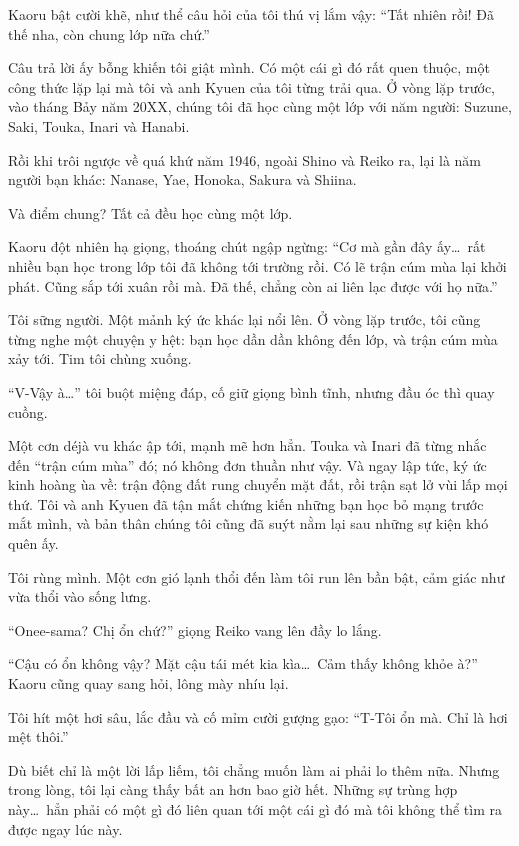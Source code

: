 \documentclass[../main.tex]{subfiles}
\begin{document}
Kaoru bật cười khẽ, như thể câu hỏi của tôi thú vị lắm vậy: ``Tất nhiên rồi! Đã thế nha, còn chung lớp nữa chứ.''

Câu trả lời ấy bỗng khiến tôi giật mình. Có một cái gì đó rất quen thuộc, một công thức lặp lại mà tôi và anh Kyuen của tôi từng trải qua. Ở vòng lặp trước, vào tháng Bảy năm 20XX, chúng tôi đã học cùng một lớp với năm người: Suzune, Saki, Touka, Inari và Hanabi.

Rồi khi trôi ngược về quá khứ năm 1946, ngoài Shino và Reiko ra, lại là năm người bạn khác: Nanase, Yae, Honoka, Sakura và Shiina.

Và điểm chung? Tất cả đều học cùng một lớp.

Kaoru đột nhiên hạ giọng, thoáng chút ngập ngừng: ``Cơ mà gần đây ấy\dots\ rất nhiều bạn học trong lớp tôi đã không tới trường rồi. Có lẽ trận cúm mùa lại khởi phát. Cũng sắp tới xuân rồi mà. Đã thế, chẳng còn ai liên lạc được với họ nữa.''

Tôi sững người. Một mảnh ký ức khác lại nổi lên. Ở vòng lặp trước, tôi cũng từng nghe một chuyện y hệt: bạn học dần dần không đến lớp, và trận cúm mùa xảy tới. Tim tôi chùng xuống.

``V-Vậy à\dots'' tôi buột miệng đáp, cố giữ giọng bình tĩnh, nhưng đầu óc thì quay cuồng.

Một cơn déjà vu khác ập tới, mạnh mẽ hơn hẳn. Touka và Inari đã từng nhắc đến ``trận cúm mùa'' đó; nó không đơn thuần như vậy. Và ngay lập tức, ký ức kinh hoàng ùa về: trận động đất rung chuyển mặt đất, rồi trận sạt lở vùi lấp mọi thứ. Tôi và anh Kyuen đã tận mắt chứng kiến những bạn học bỏ mạng trước mắt mình, và bản thân chúng tôi cũng đã suýt nằm lại sau những sự kiện khó quên ấy.

Tôi rùng mình. Một cơn gió lạnh thổi đến làm tôi run lên bần bật, cảm giác như vừa thổi vào sống lưng.

``Onee-sama? Chị ổn chứ?'' giọng Reiko vang lên đầy lo lắng.

``Cậu có ổn không vậy? Mặt cậu tái mét kia kìa\dots\ Cảm thấy không khỏe à?'' Kaoru cũng quay sang hỏi, lông mày nhíu lại.

Tôi hít một hơi sâu, lắc đầu và cố mỉm cười gượng gạo:
``T-Tôi ổn mà. Chỉ là hơi mệt thôi.''

Dù biết chỉ là một lời lấp liếm, tôi chẳng muốn làm ai phải lo thêm nữa. Nhưng trong lòng, tôi lại càng thấy bất an hơn bao giờ hết. Những sự trùng hợp này\dots\ hẳn phải có một gì đó liên quan tới một cái gì đó mà tôi không thể tìm ra được ngay lúc này.
\end{document}
